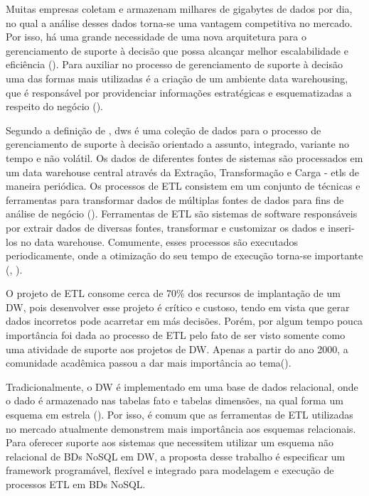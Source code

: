 Muitas empresas coletam e armazenam milhares de gigabytes de dados por dia, no qual a análise desses dados torna-se uma vantagem competitiva no mercado. Por isso, há uma grande necessidade de uma nova arquitetura para o gerenciamento de suporte à decisão que possa alcançar melhor escalabilidade e eficiência (\cite{liu:2013}). Para auxiliar no processo de gerenciamento de suporte à decisão uma das formas mais utilizadas é a criação de um ambiente data warehousing, que é responsável por providenciar informações estratégicas e esquematizadas a respeito do negócio (\cite{dayal:1997}).

Segundo a definição de \cite{kimball:2002}, \acp{dw} é uma coleção de dados para o processo de gerenciamento de suporte à decisão orientado a assunto, integrado, variante no tempo e não volátil. Os dados de diferentes fontes de sistemas são processados em um data warehouse central através da Extração, Transformação e Carga - \acp{etl} de maneira periódica. Os processos de ETL consistem em um conjunto de técnicas e ferramentas para transformar dados de múltiplas fontes de dados para fins de análise de negócio (\cite{silva:2016}). Ferramentas de ETL são sistemas de software responsáveis por extrair dados de diversas fontes, transformar e customizar os dados e inseri-los no data warehouse. Comumente, esses processos são executados periodicamente, onde a otimização do seu tempo de execução torna-se importante (\cite{vassiliadis:2005}, \cite{silva:2016}).

O projeto de ETL consome cerca de 70\% dos recursos de implantação de um DW, pois desenvolver esse projeto é crítico e custoso, tendo em vista que gerar dados incorretos pode acarretar em más decisões. Porém, por algum tempo pouca importância foi dada ao processo de ETL pelo fato de ser visto somente como uma atividade de suporte aos projetos de DW. Apenas a partir do ano 2000, a comunidade acadêmica passou a dar mais importância ao tema(\cite{silva:2012}).

Tradicionalmente, o DW é implementado em uma base de dados relacional, onde o dado é armazenado nas tabelas fato e tabelas dimensões, na qual forma um esquema em estrela (\cite{kimball:2002}). Por isso, é comum que as ferramentas de ETL utilizadas no mercado atualmente demonstrem mais importância aos esquemas relacionais. Para oferecer suporte aos sistemas que necessitem utilizar um esquema não relacional de BDs NoSQL em DW, a proposta desse trabalho é especificar um framework programável, flexível e integrado para modelagem e execução de processos ETL em BDs NoSQL.

